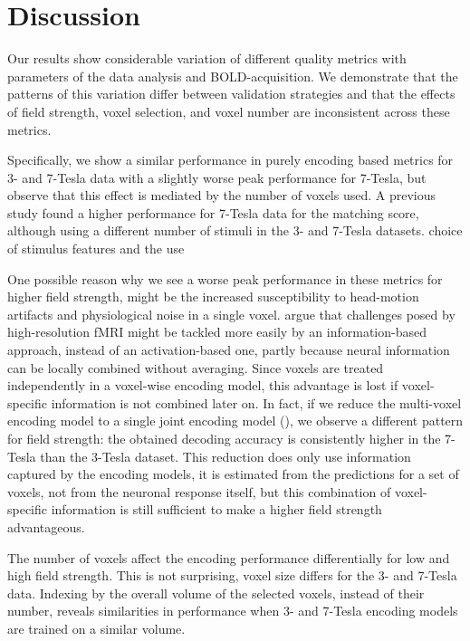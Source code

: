 \section*{Discussion}

Our results show considerable variation of different quality metrics with
parameters of the data analysis and BOLD-acquisition. We demonstrate that the
patterns of this variation differ between validation strategies and that the
effects of field strength, voxel selection, and voxel number are inconsistent
across these metrics.

Specifically, we show a similar performance in purely encoding based metrics
for 3- and 7-Tesla data with a slightly worse peak performance for 7-Tesla, but
observe that this effect is mediated by the number of voxels used. A previous
study \citep{SF14} found a higher performance for 7-Tesla data for the matching
score, although using a different number of stimuli in the 3- and 7-Tesla
datasets. %
choice of stimulus features and the use

One possible reason why we see a worse peak performance in these metrics for
higher field strength, might be the increased susceptibility to head-motion
artifacts and physiological noise in a single voxel. \citet{KB07} argue that
challenges posed by high-resolution f{MRI} might be tackled more easily by an
information-based approach, instead of an activation-based one, partly because
neural information can be locally combined without averaging. Since voxels are
treated independently in a voxel-wise encoding model, this advantage is lost if
voxel-specific information is not combined later on. In fact, if we reduce the
multi-voxel encoding model to a single joint encoding model
(\citep[see][]{NG09}), we observe a different pattern for field strength: the
obtained decoding accuracy is consistently higher in the 7-Tesla than the
3-Tesla dataset.  This reduction does only use information captured by the
encoding models, it is estimated from the predictions for a set of voxels, not
from the neuronal response itself, but this combination of voxel-specific
information is still sufficient to make a higher field strength advantageous. 


The number of voxels affect the encoding performance differentially for low and
high field strength. This is not surprising, voxel size differs for the 3- and
7-Tesla data. Indexing by the overall volume of the selected voxels, instead of
their number, reveals similarities in performance when 3- and 7-Tesla encoding
models are trained on a similar volume. 

